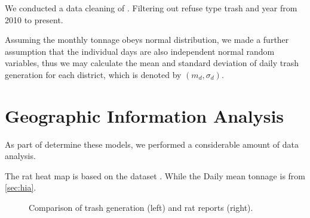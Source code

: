 \documentclass{article}
\begin{document}
We conducted a data cleaning of \cite{MonTon}. Filtering out refuse type trash and year from 2010 to present.

Assuming the monthly tonnage obeys normal distribution, we made a further assumption that the individual days are also independent normal random variables, thus we may calculate the mean and standard deviation of daily trash generation for each district, which is denoted by $(m_d, \sigma_d)$.

\section{Geographic Information Analysis}

As part of determine these models, we performed a considerable amount of data analysis.


The rat heat map is based on the dataset \cite{RatHeat}. While the Daily mean tonnage is from \cref{sec:hia}.

\begin{figure}[H]
    \centering
    \hfill
    \caption{Comparison of trash generation (left) and rat reports (right).}
    \label{fig:8both}
\end{figure}
\end{document}
